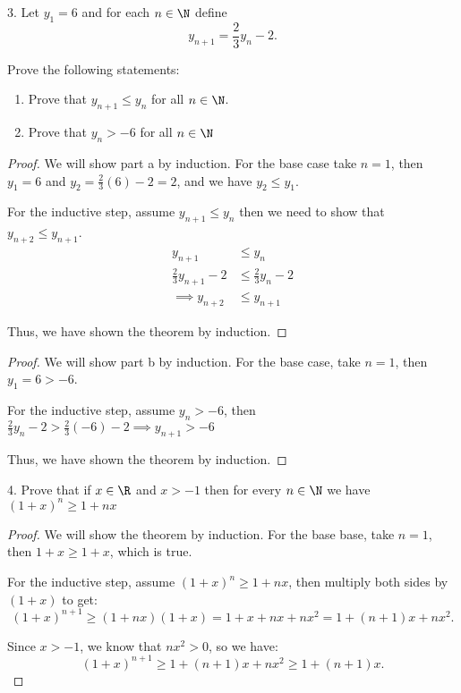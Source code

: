 3. Let $y_1 = 6$ and for each $n \in \N$ define
\[
	y_{n+1} = \frac{2}{3}y_n -2 
.\] 

Prove the following statements:
\begin{enumerate}[label = \alph*.]
	\item Prove that $y_{n + 1} \le y_n$ for all $n \in \N$.
	\item Prove that $y_n > -6$ for all $n \in \N$
   	
\end{enumerate}

\begin{proof}
	We will show part a by induction. For the base case take $n = 1$, then $y_1 = 6$ and $y_2 = \frac{2}{3}\left( 6 \right) - 2 = 2$, and we have $y_2 \le y_1$.

	For the inductive step, assume $y_{n+1} \le y_n$ then we need to show that $y_{n+2} \le y_{n+1}$. 
	\begin{align}
		y_{n+1} &\le y_n \\
		\frac{2}{3}y_{n+1} - 2 &\le \frac{2}{3}y_n - 2 \\
		\implies y_{n+2} &\le y_{n+1}
	\end{align}

	Thus, we have shown the theorem by induction.
\end{proof}

\begin{proof}
	We will show part b by induction. For the base case, take $n=1$, then $y_1 = 6 > -6$.
	
	For the inductive step, assume $y_n > -6$, then $\frac{2}{3}y_n - 2 > \frac{2}{3} \left( -6 \right) - 2 \implies y_{n+1} > -6$

	Thus, we have shown the theorem by induction.
\end{proof}

4. Prove that if $x \in \R$ and $x > -1$ then for every $n \in \N$ we have $\left( 1 + x \right)^{n} \ge  1+nx$ 

\begin{proof}
	We will show the theorem by induction. For the base base, take $n = 1$, then $1 + x \ge 1 + x$, which is true.

	For the inductive step, assume $\left( 1 + x \right)^{n} \ge 1+nx$, then multiply both sides by $\left( 1 + x \right) $ to get:
	\[
		\left( 1 + x \right)^{n+1} \ge \left( 1+nx \right) \left( 1+x \right) = 1 + x + nx + nx^{2} = 1 + \left( n+1 \right)x + nx^{2}  
	.\]

	Since $x > -1$, we know that $nx^{2} > 0$, so we have:
	\[
		\left( 1+x \right)^{n+1} \ge 1 + \left( n+1 \right) x + nx^{2} \ge 1 + \left( n+1 \right) x			
	.\] 
\end{proof}

